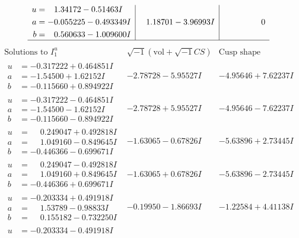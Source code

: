 \documentclass[1p]{elsarticle_modified}
\theoremstyle{definition}
\newcommand{\I}{\sqrt{-1}}
\begin{document}
$$\begin{array}{c|c|c}
\begin{aligned}
u &= \phantom{-}1.34172 - 0.51463 I \\
a &= -0.055225 - 0.493349 I \\
b &= \phantom{-}0.560633 - 1.009600 I\end{aligned}
 & \phantom{-}1.18701 - 3.96993 I & \phantom{-0.000000 } 0\\
 \hline 
 \end{array}$$\newpage$$\begin{array}{c|c|c}  
\text{Solutions to }I^u_{1}& \I (\text{vol} + \sqrt{-1}CS) & \text{Cusp shape}\\
 \hline 
\begin{aligned}
u &= -0.317222 + 0.464851 I \\
a &= -1.54500 + 1.62152 I \\
b &= -0.115660 + 0.894922 I\end{aligned}
 & -2.78728 - 5.95527 I & -4.95646 + 7.62237 I \\ \hline\begin{aligned}
u &= -0.317222 - 0.464851 I \\
a &= -1.54500 - 1.62152 I \\
b &= -0.115660 - 0.894922 I\end{aligned}
 & -2.78728 + 5.95527 I & -4.95646 - 7.62237 I \\ \hline\begin{aligned}
u &= \phantom{-}0.249047 + 0.492818 I \\
a &= \phantom{-}1.049160 - 0.849645 I \\
b &= -0.446366 - 0.699671 I\end{aligned}
 & -1.63065 - 0.67826 I & -5.63896 + 2.73445 I \\ \hline\begin{aligned}
u &= \phantom{-}0.249047 - 0.492818 I \\
a &= \phantom{-}1.049160 + 0.849645 I \\
b &= -0.446366 + 0.699671 I\end{aligned}
 & -1.63065 + 0.67826 I & -5.63896 - 2.73445 I \\ \hline\begin{aligned}
u &= -0.203334 + 0.491918 I \\
a &= \phantom{-}1.53789 - 0.98833 I \\
b &= \phantom{-}0.155182 - 0.732250 I\end{aligned}
 & -0.19950 - 1.86693 I & -1.22584 + 4.41138 I \\ \hline\begin{aligned}
u &= -0.203334 - 0.491918 I \\

\end{aligned}
\end{array}$$
\end{document}
